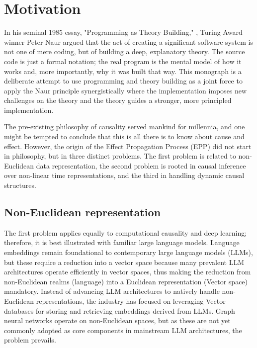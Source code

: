 \section{Motivation}
\label{sec:motivation}

In his seminal 1985 essay, "Programming as Theory Building," \cite{naur1985programming}, Turing Award winner Peter Naur argued that the act of creating a significant software system is not one of mere coding, but of building a deep, explanatory theory. The source code is just a formal notation; the real program is the mental model of how it works and, more importantly, why it was built that way. 
This monograph is a deliberate attempt to use programming and theory building as a joint force to 
apply the Naur principle synergistically where the implementation imposes new challenges on the theory 
and the theory guides a stronger, more principled implementation. 


The pre-existing philosophy of causality served mankind for millennia, and one might be tempted to conclude that this is all there is to know about cause and effect. However, the origin of the Effect Propagation Process (EPP) did not start in philosophy, but in three distinct problems. The first problem is related to non-Euclidean data representation, the second problem is rooted in causal inference over non-linear time representations, and the third in handling dynamic causal structures.

\subsection{Non-Euclidean representation}

The first problem applies equally to computational causality and deep learning; therefore, it is best illustrated with familiar  large language models. Language embeddings remain foundational to contemporary large language models (LLMs), but these require a reduction into a vector space because many prevalent LLM architectures operate efficiently in vector spaces, thus making the reduction from non-Euclidean realms (language) into a Euclidean representation (Vector space) mandatory. Instead of advancing LLM architectures to natively handle non-Euclidean representations, the industry has focused on leveraging Vector databases for storing and retrieving embeddings derived from LLMs. Graph neural networks operate on non-Euclidean spaces, but as these are not yet commonly adopted as core components in mainstream LLM architectures, the problem prevails.

